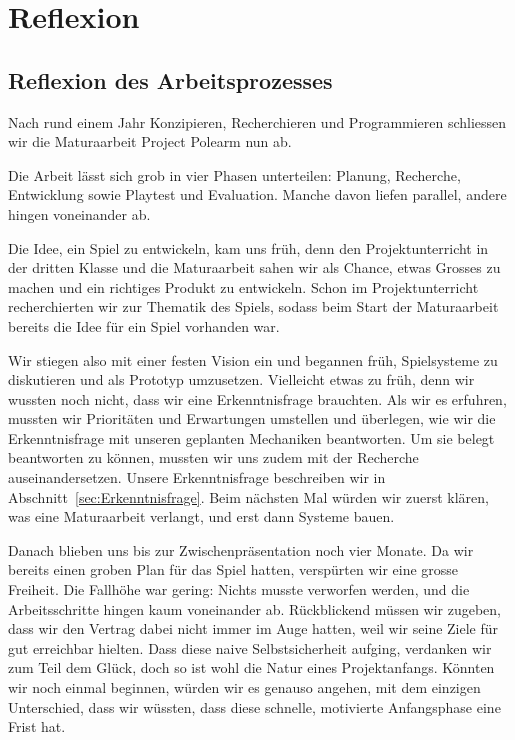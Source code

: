 \documentclass[../Main.tex]{subfiles}
\begin{document}
\section{Reflexion} \label{sec:Reflexion}

\subsection{Reflexion des Arbeitsprozesses}

Nach rund einem Jahr Konzipieren, Recherchieren und Programmieren schliessen wir die Maturaarbeit Project Polearm nun ab.

Die Arbeit lässt sich grob in vier Phasen unterteilen: Planung, Recherche, Entwicklung sowie Playtest und Evaluation. Manche davon liefen parallel, andere hingen voneinander ab.

Die Idee, ein Spiel zu entwickeln, kam uns früh, denn den Projektunterricht in der dritten Klasse und die Maturaarbeit sahen wir als Chance, etwas Grosses zu machen und ein richtiges Produkt zu entwickeln. Schon im Projektunterricht recherchierten wir zur Thematik des Spiels, sodass beim Start der Maturaarbeit bereits die Idee für ein Spiel vorhanden war.

Wir stiegen also mit einer festen Vision ein und begannen früh, Spielsysteme zu diskutieren und als Prototyp umzusetzen. Vielleicht etwas zu früh, denn wir wussten noch nicht, dass wir eine Erkenntnisfrage brauchten. Als wir es erfuhren, mussten wir Prioritäten und Erwartungen umstellen und überlegen, wie wir die Erkenntnisfrage mit unseren geplanten Mechaniken beantworten. Um sie belegt beantworten zu können, mussten wir uns zudem mit der Recherche auseinandersetzen. Unsere Erkenntnisfrage beschreiben wir in Abschnitt~\ref{sec:Erkenntnisfrage}. Beim nächsten Mal würden wir zuerst klären, was eine Maturaarbeit verlangt, und erst dann Systeme bauen.

Danach blieben uns bis zur Zwischenpräsentation noch vier Monate. Da wir bereits einen groben Plan für das Spiel hatten, verspürten wir eine grosse Freiheit. Die Fallhöhe war gering: Nichts musste verworfen werden, und die Arbeitsschritte hingen kaum voneinander ab. Rückblickend müssen wir zugeben, dass wir den Vertrag dabei nicht immer im Auge hatten, weil wir seine Ziele für gut erreichbar hielten. Dass diese naive Selbstsicherheit aufging, verdanken wir zum Teil dem Glück, doch so ist wohl die Natur eines Projektanfangs. Könnten wir noch einmal beginnen, würden wir es genauso angehen, mit dem einzigen Unterschied, dass wir wüssten, dass diese schnelle, motivierte Anfangsphase eine Frist hat.
\end{document}
